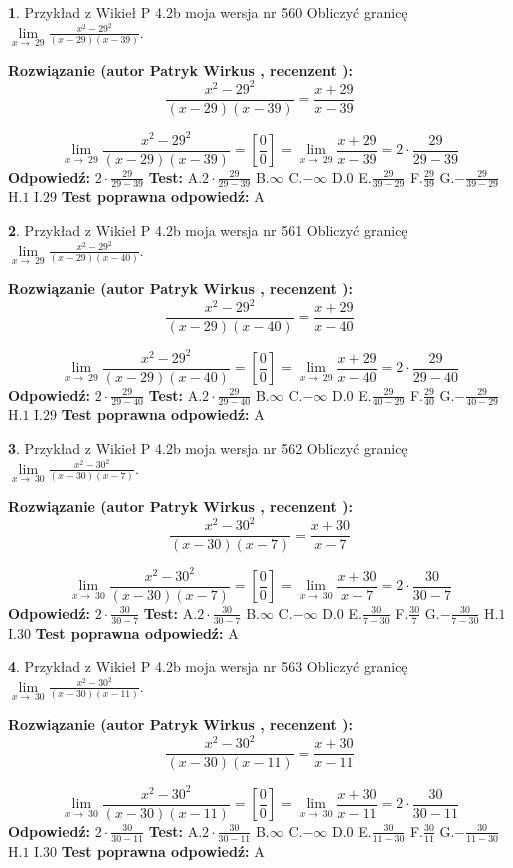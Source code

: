 \documentclass[12pt, a4paper]{article}
\theoremstyle{definition} %
\newtheorem{zad}{}
\newcommand{\zadStart}[1]{\begin{zad}#1\newline}
\newcommand{\zadStop}{\end{zad}}
\newcommand{\rozwStart}[2]{\noindent \textbf{Rozwiązanie (autor #1 , recenzent #2): }\newline}
\newcommand{\rozwStop}{\newline}
\newcommand{\odpStart}{\noindent \textbf{Odpowiedź:}\newline}
\newcommand{\odpStop}{\newline}
\newcommand{\testStart}{\noindent \textbf{Test:}\newline}
\newcommand{\testStop}{\newline}
\newcommand{\kluczStart}{\noindent \textbf{Test poprawna odpowiedź:}\newline}
\newcommand{\kluczStop}{\newline}
\begin{document}
\zadStart{Przykład z Wikieł P 4.2b moja wersja nr 560}
Obliczyć granicę $\lim\limits_{x\to\ 29}\frac{x^{2}-29^{2}}{(x-29)(x-39)}$.
\zadStop
\rozwStart{Patryk Wirkus}{}
$$\frac{x^{2}-29^{2}}{(x-29)(x-39)}=\frac{x+29}{x-39}$$

$$\lim\limits_{x\to\ 29}\frac{x^{2}-29^{2}}{(x-29)(x-39)}=[\frac{0}{0}]=\lim\limits_{x\to\ 29}\frac{x+29}{x-39}=2 \cdot \frac{29}{29-39}$$
\rozwStop
\odpStart
$2 \cdot \frac{29}{29-39}$
\odpStop
\testStart
A.$2 \cdot \frac{29}{29-39}$
B.$\infty$
C.$-\infty$
D.$0$
E.$\frac{29}{39-29}$
F.$\frac{29}{39}$
G.$-\frac{29}{39-29}$
H.$1$
I.$29$
\testStop
\kluczStart
A
\kluczStop



\zadStart{Przykład z Wikieł P 4.2b moja wersja nr 561}
Obliczyć granicę $\lim\limits_{x\to\ 29}\frac{x^{2}-29^{2}}{(x-29)(x-40)}$.
\zadStop
\rozwStart{Patryk Wirkus}{}
$$\frac{x^{2}-29^{2}}{(x-29)(x-40)}=\frac{x+29}{x-40}$$

$$\lim\limits_{x\to\ 29}\frac{x^{2}-29^{2}}{(x-29)(x-40)}=[\frac{0}{0}]=\lim\limits_{x\to\ 29}\frac{x+29}{x-40}=2 \cdot \frac{29}{29-40}$$
\rozwStop
\odpStart
$2 \cdot \frac{29}{29-40}$
\odpStop
\testStart
A.$2 \cdot \frac{29}{29-40}$
B.$\infty$
C.$-\infty$
D.$0$
E.$\frac{29}{40-29}$
F.$\frac{29}{40}$
G.$-\frac{29}{40-29}$
H.$1$
I.$29$
\testStop
\kluczStart
A
\kluczStop



\zadStart{Przykład z Wikieł P 4.2b moja wersja nr 562}
Obliczyć granicę $\lim\limits_{x\to\ 30}\frac{x^{2}-30^{2}}{(x-30)(x-7)}$.
\zadStop
\rozwStart{Patryk Wirkus}{}
$$\frac{x^{2}-30^{2}}{(x-30)(x-7)}=\frac{x+30}{x-7}$$

$$\lim\limits_{x\to\ 30}\frac{x^{2}-30^{2}}{(x-30)(x-7)}=[\frac{0}{0}]=\lim\limits_{x\to\ 30}\frac{x+30}{x-7}=2 \cdot \frac{30}{30-7}$$
\rozwStop
\odpStart
$2 \cdot \frac{30}{30-7}$
\odpStop
\testStart
A.$2 \cdot \frac{30}{30-7}$
B.$\infty$
C.$-\infty$
D.$0$
E.$\frac{30}{7-30}$
F.$\frac{30}{7}$
G.$-\frac{30}{7-30}$
H.$1$
I.$30$
\testStop
\kluczStart
A
\kluczStop



\zadStart{Przykład z Wikieł P 4.2b moja wersja nr 563}
Obliczyć granicę $\lim\limits_{x\to\ 30}\frac{x^{2}-30^{2}}{(x-30)(x-11)}$.
\zadStop
\rozwStart{Patryk Wirkus}{}
$$\frac{x^{2}-30^{2}}{(x-30)(x-11)}=\frac{x+30}{x-11}$$

$$\lim\limits_{x\to\ 30}\frac{x^{2}-30^{2}}{(x-30)(x-11)}=[\frac{0}{0}]=\lim\limits_{x\to\ 30}\frac{x+30}{x-11}=2 \cdot \frac{30}{30-11}$$
\rozwStop
\odpStart
$2 \cdot \frac{30}{30-11}$
\odpStop
\testStart
A.$2 \cdot \frac{30}{30-11}$
B.$\infty$
C.$-\infty$
D.$0$
E.$\frac{30}{11-30}$
F.$\frac{30}{11}$
G.$-\frac{30}{11-30}$
H.$1$
I.$30$
\testStop
\kluczStart
A
\kluczStop
\end{document}
